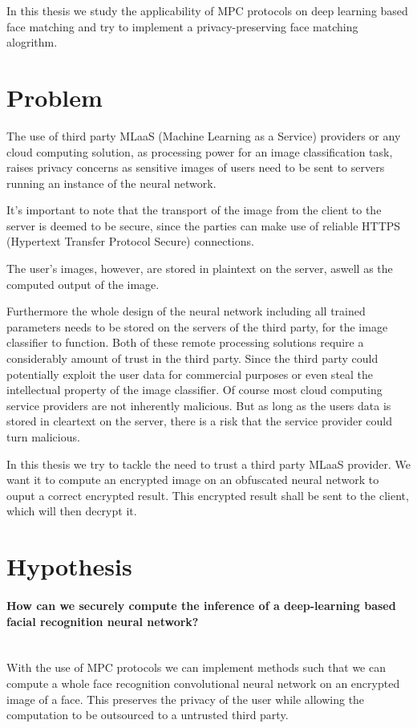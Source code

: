 In this thesis we study the applicability of MPC protocols on deep learning based face matching and try to implement a privacy-preserving face matching alogrithm.

\section{Problem}
The use of third party MLaaS (Machine Learning as a Service) providers or any cloud computing solution, as processing power for an image classification task, raises privacy concerns as sensitive images of users need to be sent to servers running an instance of the neural network.

It's important to note that the transport of the image from the client to the server is deemed to be secure, since the parties can make use of reliable HTTPS (Hypertext Transfer Protocol Secure) connections.

The user's images, however, are stored in plaintext on the server, aswell as the computed output of the image.

Furthermore the whole design of the neural network including all trained parameters needs to be stored on the servers of the third party, for the image classifier to function. Both of these remote processing solutions require a considerably amount of trust in the third party. Since the third party could potentially exploit the user data for commercial purposes or even steal the intellectual property of the image classifier. Of course most cloud computing service providers are not inherently malicious. But as long as the users data is stored in cleartext on the server, there is a risk that the service provider could turn malicious. 

In this thesis we try to tackle the need to trust a third party MLaaS provider. We want it to compute an encrypted image on an obfuscated neural network to ouput a correct encrypted result. This encrypted result shall be sent to the client, which will then decrypt it.

\section{Hypothesis}
\paragraph{How can we securely compute the inference of a deep-learning based facial recognition neural network?}\mbox{} \\
With the use of MPC protocols we can implement methods such that we can compute a whole face recognition convolutional neural network on an encrypted image of a face. This preserves the privacy of the user while allowing the computation to be outsourced to a untrusted third party.
